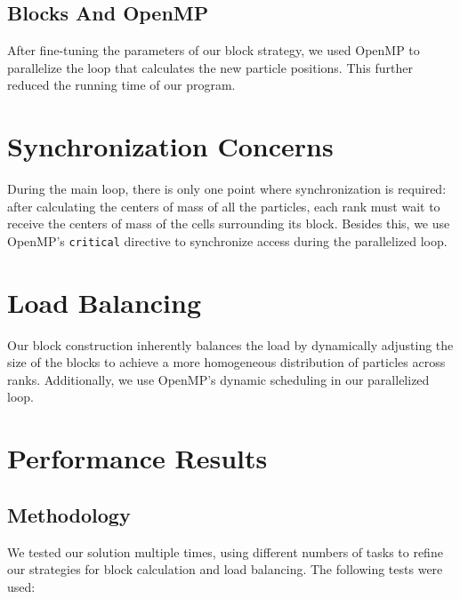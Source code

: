 \documentclass[paper=a4, fontsize=11pt]{scrartcl}
\numberwithin{equation}{section} %
\numberwithin{figure}{section}   %
\numberwithin{table}{section}    %
\begin{document}
\subsection{Blocks And OpenMP}

After fine-tuning the parameters of our block strategy, we used OpenMP to
parallelize the loop that calculates the new particle positions. This further
reduced the running time of our program.

\section{Synchronization Concerns}

During the main loop, there is only one point where synchronization is required:
after calculating the centers of mass of all the particles, each rank must wait
to receive the centers of mass of the cells surrounding its block. Besides this,
we use OpenMP's \texttt{critical} directive to synchronize access during the
parallelized loop.

\section{Load Balancing}

Our block construction inherently balances the load by dynamically adjusting the
size of the blocks to achieve a more homogeneous distribution of particles
across ranks. Additionally, we use OpenMP's dynamic scheduling in our
parallelized loop.

\section{Performance Results}

\subsection{Methodology}

We tested our solution multiple times, using different numbers of tasks to
refine our strategies for block calculation and load balancing. The following
tests were used:
\end{document}
